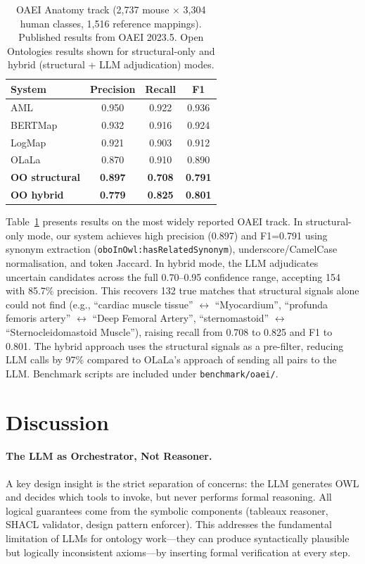 \documentclass[runningheads]{llncs}
\begin{document}
\begin{table}[t]
\centering
\caption{OAEI Anatomy track (2{,}737 mouse $\times$ 3{,}304 human classes, 1{,}516 reference mappings). Published results from OAEI 2023.5. Open Ontologies results shown for structural-only and hybrid (structural + LLM adjudication) modes.}
\label{tab:oaei}
\begin{tabular}{@{}lccc@{}}
\toprule
\textbf{System} & \textbf{Precision} & \textbf{Recall} & \textbf{F1} \\
\midrule
AML~\cite{aml} & 0.950 & 0.922 & 0.936 \\
BERTMap~\cite{bertmap} & 0.932 & 0.916 & 0.924 \\
LogMap~\cite{logmap} & 0.921 & 0.903 & 0.912 \\
OLaLa~\cite{olala} & 0.870 & 0.910 & 0.890 \\
\textbf{OO structural} & \textbf{0.897} & \textbf{0.708} & \textbf{0.791} \\
\textbf{OO hybrid} & \textbf{0.779} & \textbf{0.825} & \textbf{0.801} \\
\bottomrule
\end{tabular}
\end{table}

Table~\ref{tab:oaei} presents results on the most widely reported OAEI track. In structural-only mode, our system achieves high precision (0.897) and F1=0.791 using synonym extraction (\texttt{oboInOwl:hasRelatedSynonym}), underscore/CamelCase normalisation, and token Jaccard. In hybrid mode, the LLM adjudicates uncertain candidates across the full 0.70--0.95 confidence range, accepting 154 with 85.7\% precision. This recovers 132 true matches that structural signals alone could not find (e.g., ``cardiac muscle tissue'' $\leftrightarrow$ ``Myocardium'', ``profunda femoris artery'' $\leftrightarrow$ ``Deep Femoral Artery'', ``sternomastoid'' $\leftrightarrow$ ``Sternocleidomastoid Muscle''), raising recall from 0.708 to 0.825 and F1 to 0.801. The hybrid approach uses the structural signals as a pre-filter, reducing LLM calls by 97\% compared to OLaLa's approach of sending all pairs to the LLM. Benchmark scripts are included under \texttt{benchmark/oaei/}.


\section{Discussion}
\label{sec:discussion}

\paragraph{The LLM as Orchestrator, Not Reasoner.}
A key design insight is the strict separation of concerns: the LLM generates OWL and decides which tools to invoke, but never performs formal reasoning. All logical guarantees come from the symbolic components (tableaux reasoner, SHACL validator, design pattern enforcer). This addresses the fundamental limitation of LLMs for ontology work—they can produce syntactically plausible but logically inconsistent axioms—by inserting formal verification at every step.
\end{document}
